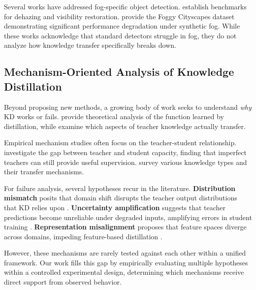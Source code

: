 Several works have addressed fog-specific object detection. \cite{li2018benchmarking} establish benchmarks for dehazing and visibility restoration. \cite{sakaridis2018semantic} provide the Foggy Cityscapes dataset demonstrating significant performance degradation under synthetic fog. While these works acknowledge that standard detectors struggle in fog, they do not analyze how knowledge transfer specifically breaks down.

\subsection{Mechanism-Oriented Analysis of Knowledge Distillation}

Beyond proposing new methods, a growing body of work seeks to understand \emph{why} KD works or fails. \cite{phuong2019functional} provide theoretical analysis of the function learned by distillation, while \cite{cho2019efficacy} examine which aspects of teacher knowledge actually transfer.

Empirical mechanism studies often focus on the teacher-student relationship. \cite{mirzadeh2020improved} investigate the gap between teacher and student capacity, finding that imperfect teachers can still provide useful supervision. \cite{gou2021knowledge} survey various knowledge types and their transfer mechanisms.

For failure analysis, several hypotheses recur in the literature. \textbf{Distribution mismatch} posits that domain shift disrupts the teacher output distributions that KD relies upon \cite{wang2020cross}. \textbf{Uncertainty amplification} suggests that teacher predictions become unreliable under degraded inputs, amplifying errors in student training \cite{kendall2017uncertainties}. \textbf{Representation misalignment} proposes that feature spaces diverge across domains, impeding feature-based distillation \cite{sun2016deep}.

However, these mechanisms are rarely tested against each other within a unified framework. Our work fills this gap by empirically evaluating multiple hypotheses within a controlled experimental design, determining which mechanisms receive direct support from observed behavior.

